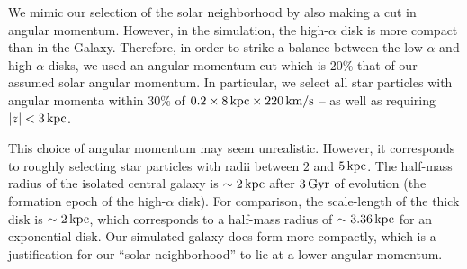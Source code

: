 We mimic our selection of the solar neighborhood by also making a cut in angular momentum. However, in the simulation, the high-$\alpha$ disk is more compact than in the Galaxy. Therefore, in order to strike a balance between the low-$\alpha$ and high-$\alpha$ disks, we used an angular momentum cut which is $20\%$ that of our assumed solar angular momentum. In particular, we select all star particles with angular momenta within $30\%$ of $0.2\times8\,\textrm{kpc}\times220\,\textrm{km}/\textrm{s}$ -- as well as requiring $\left| z \right| < 3\,\textrm{kpc}$.

This choice of angular momentum may seem unrealistic. However, it corresponds to roughly selecting star particles with radii between $2$ and $5\,\textrm{kpc}$. The half-mass radius of the isolated central galaxy is $\sim2\,\textrm{kpc}$ after $3\,\textrm{Gyr}$ of evolution (the formation epoch of the high-$\alpha$ disk). For comparison, the scale-length of the thick disk is $\sim2\,\textrm{kpc}$, which corresponds to a half-mass radius of $\sim3.36\,\textrm{kpc}$ for an exponential disk. Our simulated galaxy does form more compactly, which is a justification for our ``solar neighborhood'' to lie at a lower angular momentum.
